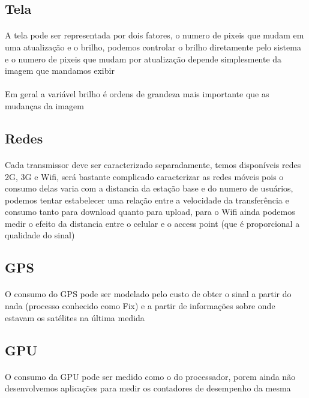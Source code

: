 \documentclass[11pt,a4paper,titlepage]{article}
\begin{document}
\subsection{Tela}
\paragraph{} A tela pode ser representada por dois fatores, o numero de pixeis que mudam em uma atualização e o brilho, podemos controlar o brilho diretamente pelo sistema e o numero de pixeis que mudam por atualização depende simplesmente da imagem que mandamos exibir
\paragraph{} Em geral a variável brilho é ordens de grandeza mais importante que as mudanças da imagem
\subsection{Redes}
\paragraph{} Cada transmissor deve ser caracterizado separadamente, temos disponíveis redes 2G, 3G e Wifi, será bastante complicado caracterizar as redes móveis pois o consumo delas varia com a distancia da estação base e do numero de usuários, podemos tentar estabelecer uma relação entre a velocidade da transferência e consumo tanto para download quanto para upload, para o Wifi ainda podemos medir o efeito da distancia entre o celular e o access point (que é proporcional a qualidade do sinal) 
\subsection{GPS}
\paragraph{} O consumo do GPS pode ser modelado pelo custo de obter o sinal a partir do nada (processo conhecido como Fix) e a partir de informações sobre onde estavam os satélites na última medida
\subsection{GPU}
\paragraph{} O consumo da GPU pode ser medido como o do processador, porem ainda não desenvolvemos aplicações para medir os contadores de desempenho da mesma
\end{document}
